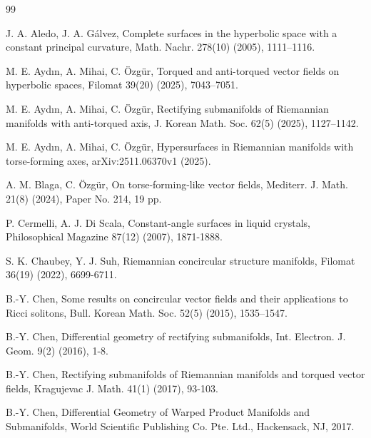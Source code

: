 \documentclass[12pt,reqno]{amsart}
\theoremstyle{definition}
\begin{document}
\begin{thebibliography}{99}

 J. A. Aledo, J. A. G\'alvez, Complete surfaces in the hyperbolic space with a constant principal curvature, Math. Nachr. 278(10) (2005), 1111–1116.

 M. E. Aydın, A. Mihai, C. Özgür, Torqued and anti-torqued vector fields on hyperbolic spaces, Filomat 39(20) (2025), 7043–7051.

 M. E. Aydın, A. Mihai, C. Özgür, Rectifying submanifolds of Riemannian manifolds with anti-torqued axis, J. Korean Math. Soc. 62(5) (2025), 1127–1142.

 M. E. Aydın, A. Mihai, C. Özgür, Hypersurfaces in Riemannian manifolds with torse-forming axes,  arXiv:2511.06370v1 (2025).


 A. M. Blaga, C. Özgür, On torse-forming-like vector fields, Mediterr. J. Math. 21(8) (2024), Paper No. 214, 19 pp.

 P. Cermelli, A. J. Di Scala, Constant-angle surfaces in liquid crystals, Philosophical Magazine 87(12) (2007), 1871-1888.

 S. K. Chaubey, Y. J. Suh, Riemannian concircular structure manifolds, Filomat 36(19) (2022), 6699-6711.

 B.-Y. Chen, Some results on concircular vector fields and their applications to Ricci solitons, Bull. Korean Math. Soc. 52(5) (2015), 1535–1547.

 B.-Y. Chen, Differential geometry of rectifying submanifolds, Int. Electron. J. Geom.  9(2) (2016), 1-8.

 B.-Y. Chen, Rectifying submanifolds of Riemannian manifolds and torqued vector fields, Kragujevac J. Math. 41(1) (2017), 93-103.

 B.-Y. Chen, Differential Geometry of Warped Product Manifolds and Submanifolds, World Scientific Publishing Co. Pte. Ltd., Hackensack, NJ, 2017.




\end{thebibliography}
\end{document}
